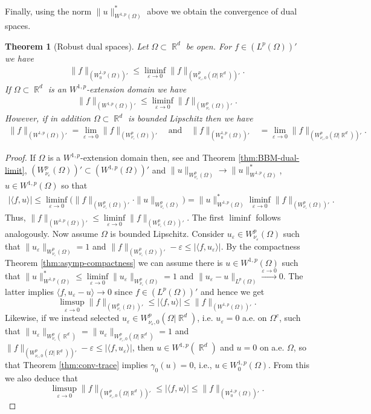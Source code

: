 \documentclass[12pt, reqno]{amsart}%
\theoremstyle{plain}  %
\newtheorem{theorem}{Theorem}[section]
\theoremstyle{definition}  %
\numberwithin{equation}{section}
\DeclareMathOperator{\R}{\mathbb{R}}
\newcommand{\eps}{\varepsilon}
\newcommand{\WnuOma}{W^{p}_{\nu_\eps}(\Omega)}
\begin{document}
 Finally, using the norm $\|u\|^*_{W^{1,p}(\Omega)}$ above we obtain the convergence of dual spaces.
\begin{theorem}[Robust dual spaces]\label{thm:conv-dual-spaces}
Let $\Omega\subset \R^d$ be open. For  $f\in (L^p(\Omega))'$ we have
\begin{align*}
\| f\|_{(W^{1,p}_0(\Omega))'}\leq \liminf_{\eps\to0} \| f\|_{ (W^p_{\nu_\eps,0}(\Omega|\R^d))'}.
\end{align*}
If $\Omega\subset \R^d$ is an $W^{1,p}$-extension domain
 we have
\begin{align*}
\| f\|_{(W^{1,p}(\Omega))'}\leq \liminf_{\eps\to0} \| f\|_{(\WnuOma)'}.
\end{align*}
However, if in addition $\Omega\subset \R^d$ is bounded Lipschitz then we have
\begin{align*}
\| f\|_{(W^{1,p}(\Omega))'}=\lim_{\eps\to0} \| f\|_{(\WnuOma)'} \quad\text{and}\quad
\| f\|_{(W^{1,p}_0(\Omega))'}
&=\lim_{\eps\to0} \| f\|_{(W^p_{\nu_\eps,0}(\Omega|\R^d))'}.
\end{align*}
\end{theorem}

\begin{proof}
If $\Omega$ is a $W^{1,p}$-extension domain then, see \cite{guy-thesis,Fog23} and Theorem \ref{thm:BBM-dual-limit},  $(\WnuOma)'\subset (W^{1,p}(\Omega))'$ and  $\| u\|_{\WnuOma} \to \|u\|^*_{W^{1,p}(\Omega)}$, $u\in W^{1,p}(\Omega)$ so that
\begin{align*}
|\langle f,u\rangle|\leq \liminf_{\eps\to0}\big( \|f\|_{(\WnuOma)'} \cdot \| u\|_{\WnuOma} \big)= \|u\|^*_{W^{1,p}(\Omega)}\liminf_{\eps\to0}\|f\|_{(\WnuOma)'}.
\end{align*}
Thus, $\| f\|_{(W^{1,p}(\Omega))'}\leq \liminf\limits_{\eps\to0} \| f\|_{(\WnuOma)'}. $ The first $\operatorname{liminf}$ follows analogously. Now assume $\Omega$ is bounded Lipschitz. Consider  $u_\eps\in \WnuOma$ such that $\|u_\eps\|_{\WnuOma}=1$ and $  \| f\|_{(\WnuOma)'}-\eps \leq |\langle f,u_\eps\rangle|$.  By the compactness Theorem \ref{thm:asymp-compactness} we can assume there is $u\in W^{1,p}(\Omega)$ such that $\|u\|^*_{W^{1,p}(\Omega)}\leq \liminf\limits_{\eps\to0}\|u_\eps\|_{\WnuOma}=1$ and $\|u_\eps-u\|_{L^{p}(\Omega)}\xrightarrow{\eps\to0}0$. The latter implies $ \langle f,u_\eps-u\rangle\to 0$ since $f\in (L^p(\Omega))'$ and hence we get
$$\limsup\limits_{\eps\to0} \| f\|_{(\WnuOma)'}\leq |\langle f,u\rangle|\leq\| f\|_{(W^{1,p}(\Omega))'}.$$ Likewise, if we instead selected
$u_\eps\in W^p_{\nu_\eps,0}(\Omega |\R^d)$, i.e. $u_\eps=0$ a.e. on $\Omega^c$, such that $\|u_\eps\|_{W^p_{\nu_\eps}(\R^d)}=\|u_\eps\|_{W^p_{\nu_\eps,0}(\Omega |\R^d)}=1$ and $  \| f\|_{(W^p_{\nu_\eps,0}(\Omega |\R^d))'}-\eps \leq |\langle f,u_\eps\rangle|$, then $u\in W^{1,p}(\R^d)$ and $u=0$ on a.e. $\Omega$, so that Theorem \ref{thm:conv-trace} implies  $\gamma_0 (u)=0$, i.e., $u\in W^{1,p}_0(\Omega)$. From this we also deduce that
$$\limsup\limits_{\eps\to0} \| f\|_{(W^p_{\nu_\eps,0}(\Omega |\R^d))'}\leq |\langle f,u\rangle|\leq\| f\|_{(W^{1,p}_0(\Omega))'}.$$
\end{proof}
\end{document}
